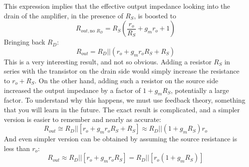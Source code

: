 This expression implies that the effective output impedance looking into the drain of the amplifier, in the presence of $R_S$, is boosted to
    \begin{equation}
        R_{out,\text{no $R_D$}} =  {{R_S}\left( {\frac{{{r_o}}}{{{R_S}}} + {g_m}{r_o} + 1} \right)} 
    \end{equation}
Bringing back $R_D$:
    \begin{equation}
        {R_{out}} = {R_D}||\left( {{r_o} + {g_m}{r_o}{R_S} + {R_S}} \right) 
    \end{equation}
This is a very interesting result, and not so obvious.  Adding a resistor $R_S$ in series with the transistor on the drain side would simply increase the resistance to $r_o + R_S$.  On the other hand, adding such a resistor on the source side increased the output impedance by a factor of $1 + g_m R_S$, potentially a large factor.  To understand why this happens, we must use feedback theory, something that you will learn in the future.
The exact result is complicated, and a simpler version is easier to remember and nearly as accurate:
    \begin{equation} 
        {R_{out}} \cong {R_D}||[{r_o} + {g_m}{r_o}{R_S} + {R_S}] \approx R_D || (1 + g_m R_S) r_o
    \end{equation}
And even simpler version can be obtained by assuming the source resistance is less than $r_o$:
    \begin{equation} 
        {R_{out}} \approx {R_D}||[{r_o} + {g_m}{r_o}{R_S}] = {R_D}||[{r_o}(1 + {g_m}{R_S})]
    \end{equation}
